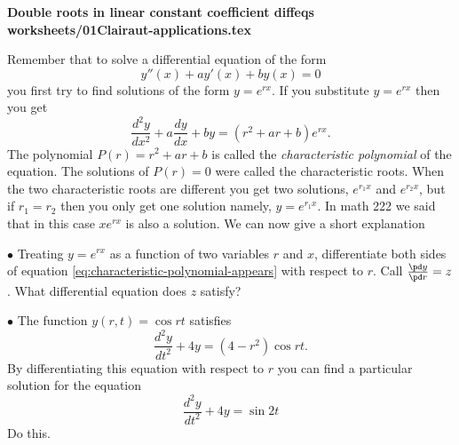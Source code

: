 \begin{center}
    \bfseries\sffamily
    Double roots in linear constant coefficient diffeqs\\
    \ttfamily worksheets/01Clairaut-applications.tex
\end{center}
\begin{multicols}{2}
Remember that to solve a differential equation of the form
\begin{equation}
    y''(x) + a y'(x) + b y(x) = 0
    \label{eq:cont-coeff-diffeq}
\end{equation}
you first try to find solutions of the form $y=e^{rx}$.  If you
substitute
$y=e^{rx}$ then you get
\begin{equation}\label{eq:characteristic-polynomial-appears}
    \frac{d^2y}{dx^2} + a\frac{dy}{dx}+by = (r^2+ar+b) e^{rx}.
\end{equation}
The polynomial $P(r) = r^2+ar+b$ is called the \textit{characteristic
polynomial} of the equation.  The solutions of $P(r) = 0$ were called
the
characteristic roots.  When the two characteristic roots are different
you get two solutions, $e^{r_1x}$ and $e^{r_2x}$, but if $r_1=r_2$
then you only
get one solution namely, $y=e^{r_1x}$.  In math 222 we said that 
in this case $xe^{rx}$ is also a solution.  We can now give a short
explanation

$\bullet$ Treating $y= e^{rx}$ as a function of two variables $r$ and $x$, differentiate
both sides of equation \eqref{eq:characteristic-polynomial-appears} with respect
to $r$.  Call $\frac{\pd y}{\pd r} = z$.  What differential equation does
$z$ satisfy?

$\bullet$ The function $y(r, t) = \cos rt$ satisfies
\[
\frac{d^2 y}{dt^2} + 4 y = (4-r^2)\cos rt.
\]
By differentiating this equation with respect to $r$ 
you can find a particular solution for the equation 
\[
\frac{d^2 y}{dt^2} + 4 y = \sin2t
\]
Do this.

\end{multicols}



